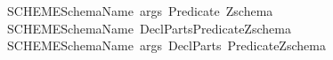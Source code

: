 \begin{isabellebody}
\ \ {\isachardoublequoteopen}{\isacharunderscore}SCHEME{}{\isachardoublequoteclose}{\isacharcolon}{\isacharcolon}{\isachardoublequoteopen}{\isacharbrackleft}SchemaName{\isacharcomma}\ args{\isacharcomma}\ Predicate{\isacharbrackright}{\isacharequal}{\isachargreater}\ Zschema{\isachardoublequoteclose}\ \ \ {\isacharparenleft}{\isachardoublequoteopen}{\isacharplus}{\isacharminus}{\isacharminus}\ {\isacharunderscore}\ {\isacharbrackleft}{\isacharunderscore}{\isacharbrackright}\ {\isacharminus}{\isacharminus}{\isacharminus}{\isacharslash}{\isacharslash}{\isacharbar}{\isacharminus}{\isacharminus}{\isacharslash}{\isacharslash}{\isacharparenleft}{}\ {\isacharunderscore}{\isacharparenright}{\isacharslash}{\isacharslash}{\isacharminus}{\isacharminus}{\isacharminus}{\isachardoublequoteclose}{\isacharparenright}\isanewline
\ \ {\isachardoublequoteopen}{\isacharunderscore}SCHEME{}{\isachardoublequoteclose}{\isacharcolon}{\isacharcolon}{\isachardoublequoteopen}{\isacharbrackleft}SchemaName{\isacharcomma}\ DeclParts{\isacharcomma}Predicate{\isacharbrackright}{\isacharequal}{\isachargreater}Zschema{\isachardoublequoteclose}{\isacharparenleft}{\isachardoublequoteopen}{\isacharplus}{\isacharminus}{\isacharminus}\ {\isacharunderscore}\ {\isacharminus}{\isacharminus}{\isacharminus}{\isacharslash}{\isacharslash}{\isacharparenleft}{}\ {\isacharunderscore}{\isacharparenright}{\isacharslash}{\isacharslash}{\isacharbar}{\isacharminus}{\isacharminus}{\isacharslash}{\isacharslash}{\isacharparenleft}{}\ {\isacharunderscore}{\isacharparenright}{\isacharslash}{\isacharslash}{\isacharminus}{\isacharminus}{\isacharminus}{\isachardoublequoteclose}{\isacharparenright}\isanewline
\ \ {\isachardoublequoteopen}{\isacharunderscore}SCHEME{}{\isachardoublequoteclose}{\isacharcolon}{\isacharcolon}{\isachardoublequoteopen}{\isacharbrackleft}SchemaName{\isacharcomma}\ args{\isacharcomma}\ DeclParts{\isacharcomma}\ Predicate{\isacharbrackright}{\isacharequal}{\isachargreater}Zschema{\isachardoublequoteclose}\ {\isacharparenleft}{\isachardoublequoteopen}{\isacharplus}{\isacharminus}{\isacharminus}\ {\isacharunderscore}\ {\isacharbrackleft}{\isacharunderscore}{\isacharbrackright}\ {\isacharminus}{\isacharminus}{\isacharminus}{\isacharslash}{\isacharslash}{\isacharparenleft}{}\ {\isacharunderscore}{\isacharparenright}{\isacharslash}{\isacharslash}{\isacharbar}{\isacharminus}{\isacharminus}{\isacharslash}{\isacharslash}{\isacharparenleft}{}\ {\isacharunderscore}{\isacharparenright}{\isacharslash}{\isacharslash}{\isacharminus}{\isacharminus}{\isacharminus}{\isachardoublequoteclose}{\isacharparenright}\ \isanewline

\end{isabellebody}
